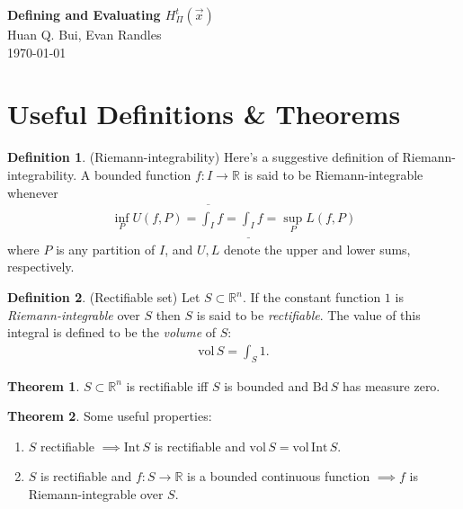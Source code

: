 \documentclass{article}
\theoremstyle{definition}
\newtheorem{defn}{Definition}[section]
\newtheorem{thm}{Theorem}[section]
\begin{document}
\begin{center}
	\textbf{\Large{Defining and Evaluating $H^t_\Pi(\vec{x})$}}\\
	{Huan Q. Bui, Evan Randles}\\
	\today\\
\end{center}


\tableofcontents

\newpage



\section{Useful Definitions \& Theorems}

\begin{defn}
(Riemann-integrability) Here's a suggestive definition of Riemann-integrability. A bounded function $f: I \to \mathbb{R}$ is said to be Riemann-integrable whenever
\begin{align*}
    \inf_P U(f,P) = \overline{\int_I}f = \underline{\int_I} f = \sup_P L(f,P)
\end{align*}
where $P$ is any partition of $I$, and $U,L$ denote the upper and lower sums, respectively. 
\end{defn}

 
\begin{defn}
(Rectifiable set) Let $S \subset \mathbb{R}^n$. If the constant function $1$ is \textit{Riemann-integrable} over $S$ then $S$ is said to be \textit{rectifiable}. The value of this integral is defined to be the \textit{volume} of $S$:
\begin{align*}
    \text{vol}\,S = \int_S 1.
\end{align*}
\end{defn}


\begin{thm}
    $S \subset \mathbb{R}^n$ is rectifiable iff $S$ is bounded and $\text{Bd}\,S$ has measure zero.
\end{thm}

\begin{thm}
    Some useful properties:
    \begin{enumerate}
        \item $S$ rectifiable $\implies \text{Int}\,S$ is rectifiable and $\text{vol}\,S = \text{vol}\,\text{Int}\,S$.
        \item $S$ is rectifiable and $f:S\to \mathbb{R}$ is a bounded continuous function $\implies f$ is Riemann-integrable over $S$. 
    \end{enumerate}
\end{thm}
\end{document}
